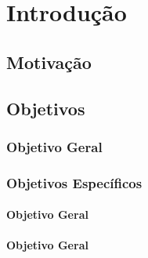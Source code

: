 \chapter{Introdução}
\label{chap:introducao}

\lipsum[2]
\lipsum[2]
\lipsum[2]

\section{Motivação}
\lipsum[2]
\lipsum[2]

\section{Objetivos}

\subsection{Objetivo Geral}
\lipsum[2]

\subsection{Objetivos Específicos}
	\lipsum[2]
	
	\begin{alineas}
		\item \lipsum[2]
		\item \lipsum[2]
		\begin{alineas}
			\item \lipsum[2]
			\item \lipsum[2]
		\end{alineas}
		\item \lipsum[2]	
	\end{alineas}
	
	\lipsum[2]
\subsubsection{Objetivo Geral}
	\lipsum[2]
	
\subsubsection{Objetivo Geral}
	\lipsum[2]
	
